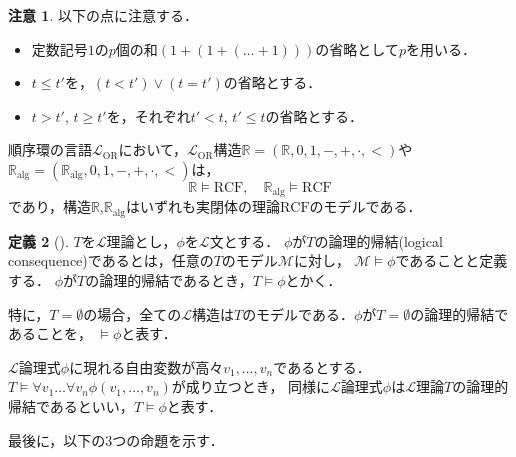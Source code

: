 \documentclass[uplatex, dvipdfmx]{jsarticle}
\numberwithin{equation}{section}
\newcommand{\R}{\mathbb{R}}
\newcommand{\Ralg}{\mathbb{R}_\mathrm{alg}}
\newcommand{\RCF}{\mathrm{RCF}}
\theoremstyle{definition}
\newtheorem{definition}{定義}[section]
\newtheorem{remark}[definition]{注意}
\begin{document}
\begin{remark}以下の点に注意する．
     \begin{itemize}
          \item 
          定数記号$1$の$p$個の和$(1+(1 + (\dots + 1)))$の省略として$p$を用いる．
          \item 
          $t \leq t'$を，$(t<t') \lor (t=t')$の省略とする．
          \item
          $t > t'$, $t \geq t'$を，それぞれ$t' < t$, $t' \leq t$の省略とする．
     \end{itemize}
\end{remark}


順序環の言語$\mathcal{L}_{\mathrm{OR}}$において，$\mathcal{L}_\mathrm{OR}$構造$\R=(\R,0,1,-,+,\cdot,<)$や$\Ralg=(\Ralg,0,1,-,+,\cdot,<)$は，
\begin{equation}
     \R \models \RCF, \quad \Ralg \models \RCF
\end{equation}
であり，構造$\R$,$\Ralg$はいずれも実閉体の理論$\RCF$のモデルである．

\begin{definition}[{\cite[Definition 1.2.12]{MR1924282}}]
     $T$を$\mathcal{L}$理論とし，$\phi$を$\mathcal{L}$文とする．
     $\phi$が$T$の論理的帰結(logical consequence)であるとは，任意の$T$のモデル$\mathcal{M}$に対し，
     $\mathcal{M} \models \phi$であることと定義する．
     $\phi$が$T$の論理的帰結であるとき，$T \models \phi$とかく．

     特に，$T = \emptyset$の場合，全ての$\mathcal{L}$構造は$T$のモデルである．$\phi$が$T=\emptyset$の論理的帰結であることを，
     $\models \phi$と表す．
\end{definition}

$\mathcal{L}$論理式$\phi$に現れる自由変数が高々$v_1, \dots, v_n$であるとする．
$T \models \forall v_1 \dots \forall v_n \phi(v_1, \dots, v_n)$が成り立つとき，
同様に$\mathcal{L}$論理式$\phi$は$\mathcal{L}$理論$T$の論理的帰結であるといい，$T \models \phi$と表す．

最後に，以下の3つの命題を示す．
\end{document}
